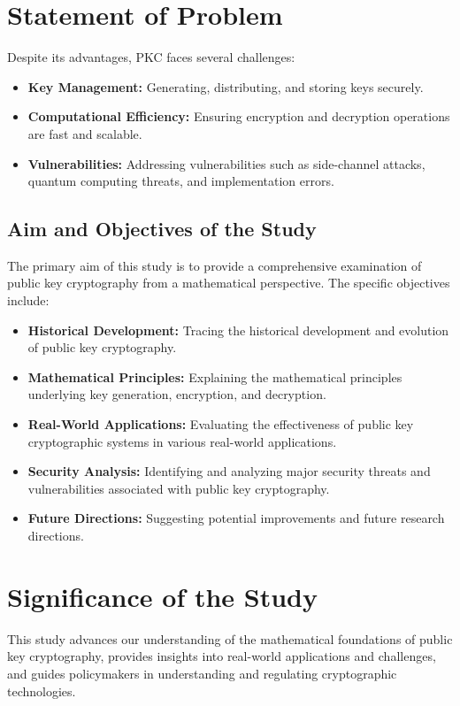 \documentclass[12pt]{report}
\numberwithin{equation}{chapter}
\begin{document}
\section{Statement of Problem}
Despite its advantages, PKC faces several challenges:
\begin{itemize}
    \item \textbf{Key Management:} Generating, distributing, and storing keys securely.
    \item \textbf{Computational Efficiency:} Ensuring encryption and decryption operations are fast and scalable.
    \item \textbf{Vulnerabilities:} Addressing vulnerabilities such as side-channel attacks, quantum computing threats, and implementation errors.
\end{itemize}


\subsection{Aim and Objectives of the Study}
The primary aim of this study is to provide a comprehensive examination of public key cryptography from a mathematical perspective. The specific objectives include:
\begin{itemize}
    \item \textbf{Historical Development:} Tracing the historical development and evolution of public key cryptography.
    \item \textbf{Mathematical Principles:} Explaining the mathematical principles underlying key generation, encryption, and decryption.
    \item \textbf{Real-World Applications:} Evaluating the effectiveness of public key cryptographic systems in various real-world applications.
    \item \textbf{Security Analysis:} Identifying and analyzing major security threats and vulnerabilities associated with public key cryptography.
    \item \textbf{Future Directions:} Suggesting potential improvements and future research directions.
\end{itemize}

\section{Significance of the Study}
This study advances our understanding of the mathematical foundations of public key cryptography, provides insights into real-world applications and challenges, and guides policymakers in understanding and regulating cryptographic technologies.
\end{document}
